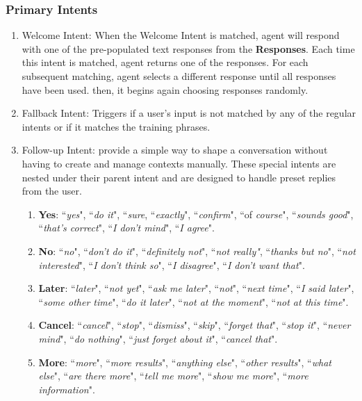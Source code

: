 \documentclass{scrreprt}
\begin{document}
\subsubsection{Primary Intents}

\begin{enumerate}
    \item Welcome Intent: When the Welcome Intent is matched, agent will respond with one of the pre-populated text responses from the \textbf{Responses}. Each time this intent is matched, agent returns one of the responses. For each subsequent matching, agent selects a different response until all responses have been used. then, it begins again choosing responses randomly.
    
    \item Fallback Intent: Triggers if a user's input is not matched by any of the regular intents or if it matches the training phrases.
    \item Follow-up Intent: provide a simple way to shape a conversation without having to create and manage contexts manually. These special intents are nested under their parent intent and are designed to handle preset replies from the user.
    \begin{enumerate}
        \item \textbf{Yes}: ``\textit{yes}", ``\textit{do it}", ``\textit{sure}, ``\textit{exactly}", ``\textit{confirm}", ``of \textit{course}", ``\textit{sounds good}", ``\textit{that's correct}", ``\textit{I don't mind}", ``\textit{I agree}".
        \item \textbf{No}: ``\textit{no}", ``\textit{don't do it}", ``\textit{definitely not}", ``\textit{not really"}, ``\textit{thanks but no}", ``\textit{not interested}", ``\textit{I don't think so}", ``\textit{I disagree}", ``\textit{I don't want that}".
        \item \textbf{Later}: ``\textit{later}", ``\textit{not yet}", ``\textit{ask me later}", ``\textit{not}", ``\textit{next time}", ``\textit{I said later}", ``\textit{some other time}", ``\textit{do it later}", ``\textit{not at the moment}", ``\textit{not at this time}".
        \item \textbf{Cancel}: ``\textit{cancel}", ``\textit{stop}", ``\textit{dismiss}", ``\textit{skip}", ``\textit{forget that}", ``\textit{stop it}", ``\textit{never mind}", ``\textit{do nothing}", ``\textit{just forget about it}", ``\textit{cancel that}".
        \item \textbf{More}: ``\textit{more}", ``\textit{more results}", ``\textit{anything else}", ``\textit{other results}", ``\textit{what else}", ``\textit{are there more}", ``\textit{tell me more}", ``\textit{show me more}", ``\textit{more information}".

\end{enumerate}
\end{enumerate}
\end{document}
